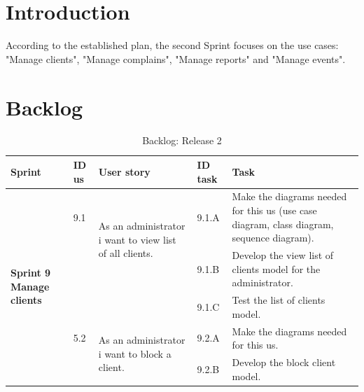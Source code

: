\documentclass[12pt,a4paper]{report}
\begin{document}
	\section*{Introduction}
	According to the established plan, the second Sprint focuses on the use cases: "Manage clients", "Manage complains", "Manage reports" and "Manage events".
	\section{Backlog}
	\begin{table}[H]
		\begin{center}
			\captionsetup[table]{skip=10pt}
			\caption{Backlog: Release 2}
			\setlength\doublerulesep{0.5pt}
			\begin{tabular}{|  p{3cm}|  p{1cm}| p{4cm}|  p{1cm}| p{6cm}|}
				\hline 
				\rowcolor{LightCyan}
				\textbf{Sprint} & \textbf{ID \ac{us}} & \textbf{User story} & \textbf{ID task} & \textbf{Task} 
				\\
				\hline
				\multirow{5}{3cm}{\textbf{Sprint 9} \textbf{Manage clients} }
				&                       
				9.1  &  
				\multirow{2}{4cm}{As an administrator i want to view list of all clients.}
				
				&				                      
				9.1.A &                        
				Make the diagrams needed for this \ac{us} (use case diagram, class diagram, sequence diagram).
				\\ 
				\cline{4-5}    
				&                   
				&                                 
				&                        
				9.1.B &                        
				Develop the view list of clients model for the administrator.
				\\ 
				\cline{4-5}    
				&                   
				&                                 
				&                        
				9.1.C &                        
				Test the list of clients model.
				\\
				\cline{2-5}  
				
				&                       
				5.2  &  
				\multirow{2}{4cm}{As an administrator i want to block a client.}
				
				&				                      
				9.2.A &                        
				Make the diagrams needed for this \ac{us}.
				\\ 
				\cline{4-5}    
				&                   
				&                                 
				&                        
				9.2.B &                        
				Develop the block client model.
				
				
				
				
				
			\end{tabular}
			
		\end{center}
		
	\end{table}
\end{document}
